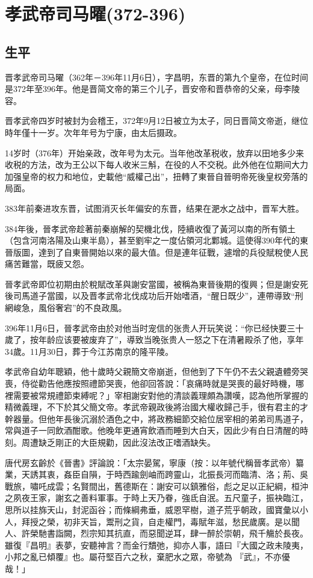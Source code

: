 
\section{孝武帝司马曜\tiny(372-396)}

\subsection{生平}

晋孝武帝司马曜（362年－396年11月6日），字昌明，东晋的第九个皇帝，在位时间是372年至396年。他是晋简文帝的第三个儿子，晋安帝和晋恭帝的父亲，母李陵容。

晋孝武帝四岁时被封为会稽王，372年9月12日被立为太子，同日晋简文帝逝，继位時年僅十一岁。次年年号为宁康，由太后摄政。

14岁时（376年）开始亲政，改年号为太元。当年他改革税收，放弃以田地多少来收税的方法，改为王公以下每人收米三斛，在役的人不交税。此外他在位期间大力加强皇帝的权力和地位，史載他“威權己出”，扭轉了東晉自晉明帝死後皇权旁落的局面。

383年前秦进攻东晋，试图消灭长年偏安的东晋，结果在淝水之战中，晋军大胜。

384年後，晉孝武帝趁著前秦崩解的契機北伐，陸續收復了黃河以南的所有領土（包含河南洛陽及山東半島），甚至劉牢之一度佔領河北鄴城。這使得390年代的東晉版圖，達到了自東晉開始以來的最大值。但是連年征戰，遽增的兵役賦稅使人民痛苦難當，既疲又怨。

晉孝武帝即位初期由於稅賦改革與謝安當國，被稱為東晉後期的復興；但是謝安死後司馬道子當國，以及晋孝武帝北伐成功后开始嗜酒，“醒日既少”，連帶導致“刑網峻急，風俗奢宕”的不良政風。

396年11月6日，晉孝武帝由於对他当时宠信的张贵人开玩笑说：“你已经快要三十歲了，按年龄应该要被废弃了”，導致当晚张贵人一怒之下在清暑殿杀了他，享年34歲。11月30日，葬于今江苏南京的隆平陵。

孝武帝自幼年聰穎，他十歲時父親簡文帝崩逝，但他到了下午仍不去父親遺體旁哭喪，侍從勸告他應按照禮節哭喪，他卻回答說：「哀痛時就是哭喪的最好時機，哪裡需要被常規禮節束縛呢？」宰相謝安對他的清談義理頗為讚嘆，認為他所掌握的精微義理，不下於其父簡文帝。孝武帝親政後將治國大權收歸己手，很有君主的才幹器量。但他年長後沉溺於酒色之中，將政務細節交給位居宰相的弟弟司馬道子，常與道子一同飲酒酣歌。他晚年更通宵飲酒而睡到大白天，因此少有白日清醒的時刻。周遭缺乏剛正的大臣規勸，因此沒法改正嗜酒缺失。

唐代房玄齡於《晉書》評論說：「太宗晏駕，寧康（按：以年號代稱晉孝武帝）纂業，天誘其衷，姦臣自隕，于時西踰劍岫而跨靈山，北振長河而臨清、洛；荊、吳戰旅，嘯吒成雲；名賢間出，舊德斯在：謝安可以鎮雅俗，彪之足以正紀綱，桓沖之夙夜王家，謝玄之善料軍事。于時上天乃眷，強氐自泯。五尺童子，振袂臨江，思所以挂旆天山，封泥函谷；而條綱弗垂，威恩罕樹，道子荒乎朝政，國寶彙以小人，拜授之榮，初非天旨，鬻刑之貨，自走權門，毒賦年滋，愁民歲廣。是以聞人、許榮馳書詣闕，烈宗知其抗直，而惡聞逆耳，肆一醉於崇朝，飛千觴於長夜。雖復『昌明』表夢，安聽神言？而金行穨弛，抑亦人事，語曰『大國之政未陵夷，小邦之亂已傾覆』也。屬苻堅百六之秋，棄肥水之眾，帝號為 『武』，不亦優哉！」

